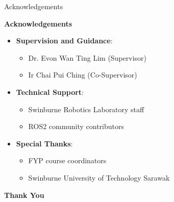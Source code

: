\documentclass[aspectratio=169]{beamer}
\begin{document}
\begin{frame}{Acknowledgements}
  \begin{center}
    \large \textbf{Acknowledgements}
  \end{center}
  \begin{itemize}
  \item \textbf{Supervision and Guidance}:
    \begin{itemize}
    \item Dr. Evon Wan Ting Lim (Supervisor)
    \item Ir Chai Pui Ching (Co-Supervisor)
    \end{itemize}
  \item \textbf{Technical Support}:
    \begin{itemize}
    \item Swinburne Robotics Laboratory staff
    \item ROS2 community contributors
    \end{itemize}
  \item \textbf{Special Thanks}:
    \begin{itemize}
    \item FYP course coordinators
    \item Swinburne University of Technology Sarawak
    \end{itemize}
  \end{itemize}
  \vspace{0.5cm}
  \begin{center}
    \large \textbf{Thank You}
  \end{center}
\end{frame}
\end{document}

